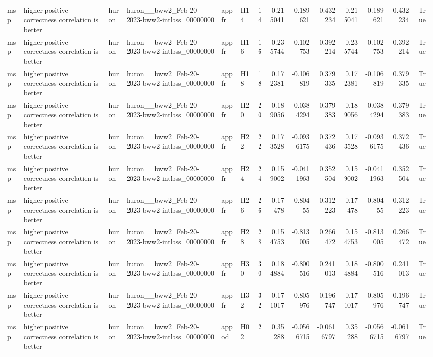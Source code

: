 \begin{longtable}{llllllrrrrrrrr}
msp & higher positive correctness correlation is better & huron & huron\_\_bww2\_Feb-20-2023-bww2-intloss\_00000000 & appfr & H14 & 14 & 0.215041 & -0.189621 & 0.432234 & 0.215041 & -0.189621 & 0.432234 & True \\
msp & higher positive correctness correlation is better & huron & huron\_\_bww2\_Feb-20-2023-bww2-intloss\_00000000 & appfr & H16 & 16 & 0.235744 & -0.102753 & 0.392214 & 0.235744 & -0.102753 & 0.392214 & True \\
msp & higher positive correctness correlation is better & huron & huron\_\_bww2\_Feb-20-2023-bww2-intloss\_00000000 & appfr & H18 & 18 & 0.172381 & -0.106819 & 0.379335 & 0.172381 & -0.106819 & 0.379335 & True \\
msp & higher positive correctness correlation is better & huron & huron\_\_bww2\_Feb-20-2023-bww2-intloss\_00000000 & appfr & H20 & 20 & 0.189056 & -0.0384294 & 0.379383 & 0.189056 & -0.0384294 & 0.379383 & True \\
msp & higher positive correctness correlation is better & huron & huron\_\_bww2\_Feb-20-2023-bww2-intloss\_00000000 & appfr & H22 & 22 & 0.173528 & -0.0936175 & 0.372436 & 0.173528 & -0.0936175 & 0.372436 & True \\
msp & higher positive correctness correlation is better & huron & huron\_\_bww2\_Feb-20-2023-bww2-intloss\_00000000 & appfr & H24 & 24 & 0.159002 & -0.0411963 & 0.352504 & 0.159002 & -0.0411963 & 0.352504 & True \\
msp & higher positive correctness correlation is better & huron & huron\_\_bww2\_Feb-20-2023-bww2-intloss\_00000000 & appfr & H26 & 26 & 0.17478 & -0.80455 & 0.312223 & 0.17478 & -0.80455 & 0.312223 & True \\
msp & higher positive correctness correlation is better & huron & huron\_\_bww2\_Feb-20-2023-bww2-intloss\_00000000 & appfr & H28 & 28 & 0.154753 & -0.813005 & 0.266472 & 0.154753 & -0.813005 & 0.266472 & True \\
msp & higher positive correctness correlation is better & huron & huron\_\_bww2\_Feb-20-2023-bww2-intloss\_00000000 & appfr & H30 & 30 & 0.184884 & -0.800516 & 0.241013 & 0.184884 & -0.800516 & 0.241013 & True \\
msp & higher positive correctness correlation is better & huron & huron\_\_bww2\_Feb-20-2023-bww2-intloss\_00000000 & appfr & H32 & 32 & 0.171017 & -0.805976 & 0.196747 & 0.171017 & -0.805976 & 0.196747 & True \\
msp & higher positive correctness correlation is better & huron & huron\_\_bww2\_Feb-20-2023-bww2-intloss\_00000000 & appod & H02 & 2 & 0.35288 & -0.0566715 & -0.0616797 & 0.35288 & -0.0566715 & -0.0616797 & True \\

\end{longtable}
